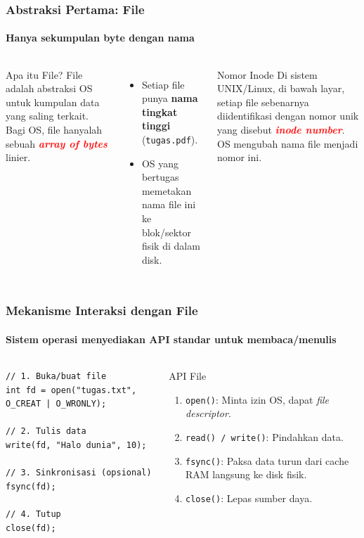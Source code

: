 \documentclass[t,aspectratio=169,xcolor=dvipsnames]{beamer}
\newcommand{\tem}[1]{\textbf{\textcolor{red}{#1}}}
\begin{document}
\begin{frame}
    \frametitle{Abstraksi Pertama: File}
    \framesubtitle{Hanya sekumpulan byte dengan nama}
    \small

    \begin{columns}[T]
        \begin{block}{Apa itu File?}
            File adalah abstraksi OS untuk kumpulan data yang saling terkait. Bagi OS, file hanyalah sebuah \tem{\textit{array of bytes}} linier.
        \end{block}

        \begin{itemize}
            \item Setiap file punya \textbf{nama tingkat tinggi} (\texttt{tugas.pdf}).
            \item OS yang bertugas memetakan nama file ini ke blok/sektor fisik di dalam disk.
        \end{itemize}

        \begin{exampleblock}{Nomor Inode}
            Di sistem UNIX/Linux, di bawah layar, setiap file sebenarnya diidentifikasi dengan nomor unik yang disebut \tem{\textit{inode number}}. OS mengubah nama file menjadi nomor ini.
        \end{exampleblock}
    \end{columns}
\end{frame}

\begin{frame}[fragile]
    \frametitle{Mekanisme Interaksi dengan File}
    \framesubtitle{Sistem operasi menyediakan API standar untuk membaca/menulis}
    \footnotesize

    \begin{columns}[T]
\begin{lstlisting}[basicstyle=\ttfamily\scriptsize]
// 1. Buka/buat file
int fd = open("tugas.txt", O_CREAT | O_WRONLY);

// 2. Tulis data
write(fd, "Halo dunia", 10);

// 3. Sinkronisasi (opsional)
fsync(fd);

// 4. Tutup
close(fd);
\end{lstlisting}

        \begin{block}{API File}
            \begin{enumerate}
                \item \texttt{open()}: Minta izin OS, dapat \textit{file descriptor}.
                \item \texttt{read() / write()}: Pindahkan data.
                \item \texttt{fsync()}: Paksa data turun dari cache RAM langsung ke disk fisik.
                \item \texttt{close()}: Lepas sumber daya.
            \end{enumerate}
        \end{block}
    \end{columns}
\end{frame}
\end{document}
